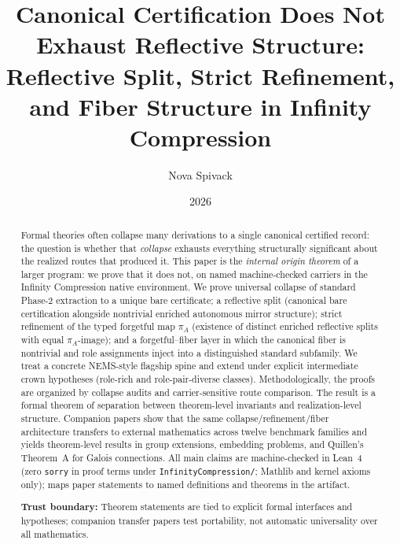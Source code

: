 \documentclass[11pt]{article}
\title{Canonical Certification Does Not Exhaust Reflective Structure:\\Reflective Split, Strict Refinement, and Fiber Structure in Infinity Compression}
\author{Nova Spivack}
\date{2026}
\begin{document}
\maketitle
\NovaZenodoAfterTitle


\begin{abstract}
\raggedright
Formal theories often collapse many derivations to a single canonical certified record: the question is whether that \emph{collapse} exhausts everything structurally significant about the realized routes that produced it. This paper is the \emph{internal origin theorem} of a larger program: we prove that it does not, on named machine-checked carriers in the Infinity Compression
native environment. We prove universal collapse of standard Phase-2 extraction to a unique bare certificate; a reflective split (canonical bare certification alongside nontrivial enriched autonomous mirror structure); strict refinement of the typed forgetful map $\pi_A$ (existence of distinct enriched reflective splits with equal $\pi_A$-image); and a forgetful--fiber layer in which the canonical fiber is nontrivial and role assignments inject into a distinguished standard subfamily. We treat a concrete NEMS-style flagship spine and extend under explicit intermediate crown hypotheses (role-rich and role-pair-diverse classes). Methodologically, the proofs are organized by collapse audits and carrier-sensitive route comparison. The result is a formal theorem of separation between theorem-level invariants and realization-level structure. Companion papers show that the same collapse/refinement/fiber architecture transfers to external mathematics across twelve benchmark families and yields theorem-level results in group extensions, embedding problems, and Quillen's Theorem~A for Galois connections. All main claims are machine-checked in Lean~4 (zero \texttt{sorry} in proof terms under \texttt{InfinityCompression/}; Mathlib and kernel axioms only);  maps paper statements to named definitions and theorems in the artifact.

\textbf{Trust boundary:} Theorem statements are tied to explicit formal interfaces and hypotheses; companion transfer papers test portability, not automatic universality over all mathematics.

\NovaZenodoInAbstract
\end{abstract}


\end{document}

